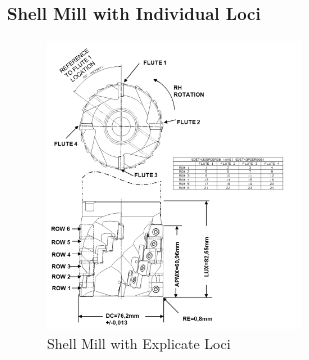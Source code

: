 \pagebreak

\subsubsection{Shell Mill with Individual Loci}

\begin{figure}[ht]
  \centering
  \includegraphics[width=0.6\textwidth]{figures/a10-shell-mill-with-explicate-loci.png}
  \caption{Shell Mill with Explicate Loci}
  \label{fig:a10-shell-mill-with-explicate-loci}
\end{figure}
\FloatBarrier

